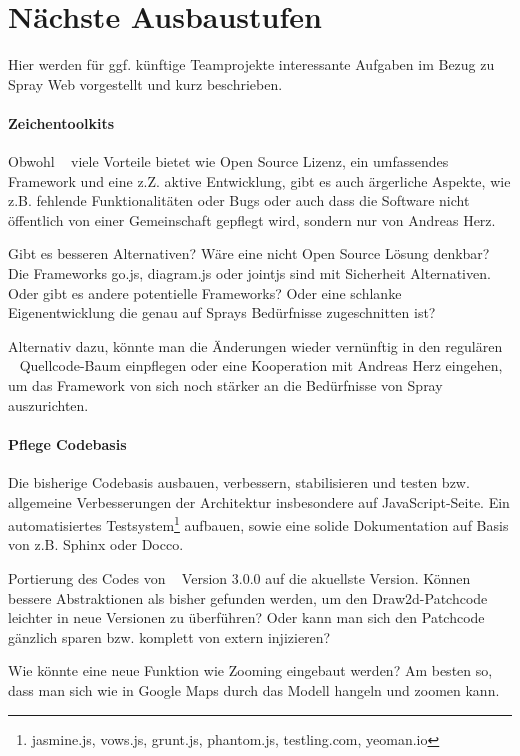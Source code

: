 \section{Nächste Ausbaustufen}

Hier werden für ggf. künftige Teamprojekte interessante Aufgaben
im Bezug zu Spray Web vorgestellt und kurz beschrieben.

\paragraph{Zeichentoolkits}

Obwohl \dd~ viele Vorteile bietet wie Open Source Lizenz, ein umfassendes
Framework und eine z.Z. aktive Entwicklung, gibt es auch ärgerliche Aspekte,
wie z.B. fehlende Funktionalitäten oder Bugs oder auch dass die Software
nicht öffentlich von einer Gemeinschaft gepflegt wird, sondern nur von
Andreas Herz.

Gibt es besseren Alternativen? Wäre eine nicht Open Source Lösung denkbar?
Die Frameworks go.js, diagram.js oder jointjs
sind mit Sicherheit Alternativen. Oder gibt es andere potentielle
Frameworks? Oder eine schlanke Eigenentwicklung die genau auf Sprays
Bedürfnisse zugeschnitten ist?

Alternativ dazu, könnte man die Änderungen wieder vernünftig in den regulären
\dd~ Quellcode-Baum einpflegen oder eine Kooperation mit Andreas Herz eingehen,
um das Framework von sich noch stärker an die Bedürfnisse von Spray auszurichten.

\paragraph{Pflege Codebasis}

Die bisherige Codebasis ausbauen, verbessern, stabilisieren und testen bzw.
allgemeine Verbesserungen der Architektur insbesondere auf JavaScript-Seite.
Ein automatisiertes Testsystem\footnote{jasmine.js, vows.js, grunt.js,
phantom.js, testling.com, yeoman.io} aufbauen, sowie eine solide Dokumentation
auf Basis von z.B. Sphinx oder Docco.

Portierung des Codes von \dd~ Version 3.0.0 auf die akuellste Version.
Können bessere Abstraktionen als bisher gefunden werden, um den
Draw2d-Patchcode leichter in neue Versionen zu überführen?
Oder kann man sich den Patchcode gänzlich sparen bzw. komplett von extern
injizieren?

Wie könnte eine neue Funktion wie Zooming eingebaut werden? Am besten so,
dass man sich wie in Google Maps durch das Modell hangeln und zoomen kann.

